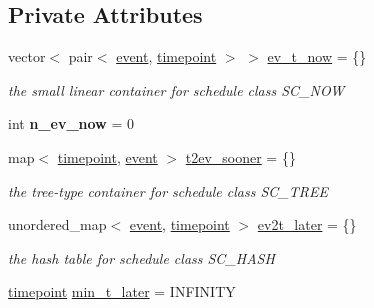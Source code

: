 \subsection*{Private Attributes}
\begin{DoxyCompactItemize}
\item 
\mbox{\label{classschedule__t_a3d0b9475f8a6567648c7ad651e337132}} 
vector$<$ pair$<$ \hyperlink{structtricl_1_1event}{event}, \hyperlink{namespacetricl_a720ff6a29f998e11e1d3622fc8df64b1}{timepoint} $>$ $>$ \hyperlink{classschedule__t_a3d0b9475f8a6567648c7ad651e337132}{ev\+\_\+t\+\_\+now} = \{\}
\begin{DoxyCompactList}\small\item\em the small linear container for schedule class S\+C\+\_\+\+N\+OW \end{DoxyCompactList}\item 
\mbox{\label{classschedule__t_a50bc279aa9c818852757d7785be8b0d6}} 
int {\bfseries n\+\_\+ev\+\_\+now} = 0
\item 
\mbox{\label{classschedule__t_abcdcff8bed511cb5cde74d112644adff}} 
map$<$ \hyperlink{namespacetricl_a720ff6a29f998e11e1d3622fc8df64b1}{timepoint}, \hyperlink{structtricl_1_1event}{event} $>$ \hyperlink{classschedule__t_abcdcff8bed511cb5cde74d112644adff}{t2ev\+\_\+sooner} = \{\}
\begin{DoxyCompactList}\small\item\em the tree-\/type container for schedule class S\+C\+\_\+\+T\+R\+EE \end{DoxyCompactList}\item 
\mbox{\label{classschedule__t_a237d5b21372294d0448a28f2355ec592}} 
unordered\+\_\+map$<$ \hyperlink{structtricl_1_1event}{event}, \hyperlink{namespacetricl_a720ff6a29f998e11e1d3622fc8df64b1}{timepoint} $>$ \hyperlink{classschedule__t_a237d5b21372294d0448a28f2355ec592}{ev2t\+\_\+later} = \{\}
\begin{DoxyCompactList}\small\item\em the hash table for schedule class S\+C\+\_\+\+H\+A\+SH \end{DoxyCompactList}\item 
\mbox{\label{classschedule__t_a68f25da0cba060c4ed786b6b20edc31f}} 
\hyperlink{namespacetricl_a720ff6a29f998e11e1d3622fc8df64b1}{timepoint} \hyperlink{classschedule__t_a68f25da0cba060c4ed786b6b20edc31f}{min\+\_\+t\+\_\+later} = I\+N\+F\+I\+N\+I\+TY

\end{DoxyCompactItemize}
